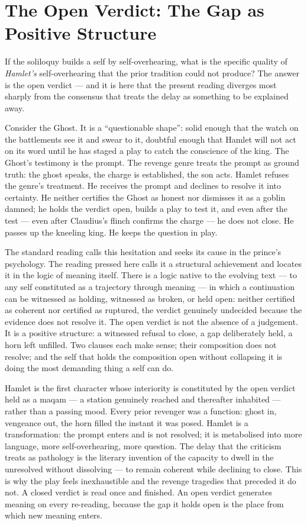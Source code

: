 \documentclass[11pt]{article}
\begin{document}
\section{The Open Verdict: The Gap as Positive Structure}

If the soliloquy builds a self by self-overhearing, what is the specific quality of \emph{Hamlet's} self-overhearing that the prior tradition could not produce? The answer is the open verdict --- and it is here that the present reading diverges most sharply from the consensus that treats the delay as something to be explained away.

Consider the Ghost. It is a ``questionable shape'': solid enough that the watch on the battlements see it and swear to it, doubtful enough that Hamlet will not act on its word until he has staged a play to catch the conscience of the king. The Ghost's testimony is the prompt. The revenge genre treats the prompt as ground truth: the ghost speaks, the charge is established, the son acts. Hamlet refuses the genre's treatment. He receives the prompt and declines to resolve it into certainty. He neither certifies the Ghost as honest nor dismisses it as a goblin damned; he holds the verdict open, builds a play to test it, and even after the test --- even after Claudius's flinch confirms the charge --- he does not close. He passes up the kneeling king. He keeps the question in play.

The standard reading calls this hesitation and seeks its cause in the prince's psychology. The reading pressed here calls it a structural achievement and locates it in the logic of meaning itself. There is a logic native to the evolving text --- to any self constituted as a trajectory through meaning --- in which a continuation can be witnessed as holding, witnessed as broken, or held open: neither certified as coherent nor certified as ruptured, the verdict genuinely undecided because the evidence does not resolve it. The open verdict is not the absence of a judgement. It is a positive structure: a witnessed refusal to close, a gap deliberately held, a horn left unfilled. Two clauses each make sense; their composition does not resolve; and the self that holds the composition open without collapsing it is doing the most demanding thing a self can do.

Hamlet is the first character whose interiority is constituted by the open verdict held as a maqam --- a station genuinely reached and thereafter inhabited --- rather than a passing mood. Every prior revenger was a function: ghost in, vengeance out, the horn filled the instant it was posed. Hamlet is a transformation: the prompt enters and is not resolved; it is metabolised into more language, more self-overhearing, more question. The delay that the criticism treats as pathology is the literary invention of the capacity to dwell in the unresolved without dissolving --- to remain coherent while declining to close. This is why the play feels inexhaustible and the revenge tragedies that preceded it do not. A closed verdict is read once and finished. An open verdict generates meaning on every re-reading, because the gap it holds open is the place from which new meaning enters.
\end{document}
